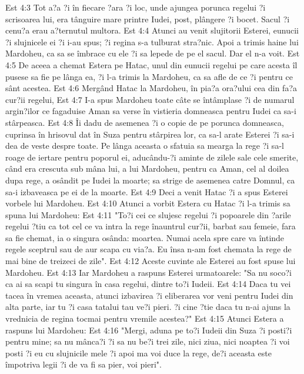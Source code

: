 Est 4:3  Tot a?a ?i în fiecare ?ara ?i loc, unde ajungea porunca regelui ?i scrisoarea lui, era tânguire mare printre Iudei, post, plângere ?i bocet. Sacul ?i cenu?a erau a?ternutul multora.
Est 4:4  Atunci au venit slujitorii Esterei, eunucii ?i slujnicele ei ?i i-au spus; ?i regina s-a tulburat stra?nic. Apoi a trimis haine lui Mardoheu, ca sa se îmbrace cu ele ?i sa lepede de pe el sacul. Dar el n-a voit.
Est 4:5  De aceea a chemat Estera pe Hatac, unul din eunucii regelui pe care acesta îl pusese sa fie pe lânga ea, ?i l-a trimis la Mardoheu, ca sa afle de ce ?i pentru ce sânt acestea.
Est 4:6  Mergând Hatac la Mardoheu, în pia?a ora?ului cea din fa?a cur?ii regelui,
Est 4:7  I-a spus Mardoheu toate câte se întâmplase ?i de numarul argin?ilor ce fagaduise Aman sa verse în vistieria domneasca pentru Iudei ca sa-i stârpeasca.
Est 4:8  Îi dadu de asemenea ?i o copie de pe porunca domneasca, cuprinsa în hrisovul dat în Suza pentru stârpirea lor, ca sa-l arate Esterei ?i sa-i dea de veste despre toate. Pe lânga aceasta o sfatuia sa mearga la rege ?i sa-l roage de iertare pentru poporul ei, aducându-?i aminte de zilele sale cele smerite, când era crescuta sub mâna lui, a lui Mardoheu, pentru ca Aman, cel al doilea dupa rege, a osândit pe Iudei la moarte; sa strige de asemenea catre Domnul, ca sa-i izbaveasca pe ei de la moarte.
Est 4:9  Deci a venit Hatac ?i a spus Esterei vorbele lui Mardoheu.
Est 4:10  Atunci a vorbit Estera cu Hatac ?i l-a trimis sa spuna lui Mardoheu:
Est 4:11  "To?i cei ce slujesc regelui ?i popoarele din ?arile regelui ?tiu ca tot cel ce va intra la rege înauntrul cur?ii, barbat sau femeie, fara sa fie chemat, ia o singura osânda: moartea. Numai acela spre care va întinde regele sceptrul sau de aur scapa cu via?a. Eu însa n-am fost chemata la rege de mai bine de treizeci de zile".
Est 4:12  Aceste cuvinte ale Esterei au fost spuse lui Mardoheu.
Est 4:13  Iar Mardoheu a raspuns Esterei urmatoarele: "Sa nu soco?i ca ai sa scapi tu singura în casa regelui, dintre to?i Iudeii.
Est 4:14  Daca tu vei tacea în vremea aceasta, atunci izbavirea ?i eliberarea vor veni pentru Iudei din alta parte, iar tu ?i casa tatalui tau ve?i pieri. ?i cine ?tie daca tu n-ai ajuns la vrednicia de regina tocmai pentru vremile acestea?"
Est 4:15  Atunci Estera a raspuns lui Mardoheu:
Est 4:16  "Mergi, aduna pe to?i Iudeii din Suza ?i posti?i pentru mine; sa nu mânca?i ?i sa nu be?i trei zile, nici ziua, nici noaptea ?i voi posti ?i eu cu slujnicile mele ?i apoi ma voi duce la rege, de?i aceasta este împotriva legii ?i de va fi sa pier, voi pieri".
